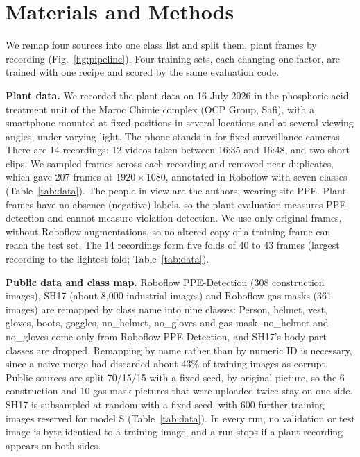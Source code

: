 \section{Materials and Methods}
\label{sec:methods}

We remap four sources into one class list and split them, plant frames by recording (Fig.~\ref{fig:pipeline}). Four training sets, each changing one factor, are trained with one recipe and scored by the same evaluation code.


\textbf{Plant data.} We recorded the plant data on 16 July 2026 in the phosphoric-acid treatment unit of the Maroc Chimie complex (OCP Group, Safi), with a smartphone mounted at fixed positions in several locations and at several viewing angles, under varying light. The phone stands in for fixed surveillance cameras. There are 14 recordings: 12 videos taken between 16:35 and 16:48, and two short clips. We sampled frames across each recording and removed near-duplicates, which gave 207 frames at $1920\times1080$, annotated in Roboflow with seven classes (Table~\ref{tab:data}). The people in view are the authors, wearing site PPE. Plant frames have no absence (negative) labels, so the plant evaluation measures PPE detection and cannot measure violation detection. We use only original frames, without Roboflow augmentations, so no altered copy of a training frame can reach the test set. The 14 recordings form five folds of 40 to 43 frames (largest recording to the lightest fold; Table~\ref{tab:data}).

\textbf{Public data and class map.} Roboflow PPE-Detection \cite{roboflowppe} (308 construction images), SH17 \cite{ahmad2024sh17} (about 8{,}000 industrial images) and Roboflow gas masks \cite{roboflowgasmasks} (361 images) are remapped by class name into nine classes: Person, helmet, vest, gloves, boots, goggles, no\_helmet, no\_gloves and gas mask. no\_helmet and no\_gloves come only from Roboflow PPE-Detection, and SH17's body-part classes are dropped. Remapping by name rather than by numeric ID is necessary, since a naive merge had discarded about 43\% of training images as corrupt. Public sources are split 70/15/15 with a fixed seed, by original picture, so the 6 construction and 10 gas-mask pictures that were uploaded twice stay on one side. SH17 is subsampled at random with a fixed seed, with 600 further training images reserved for model S (Table~\ref{tab:data}). In every run, no validation or test image is byte-identical to a training image, and a run stops if a plant recording appears on both sides.

